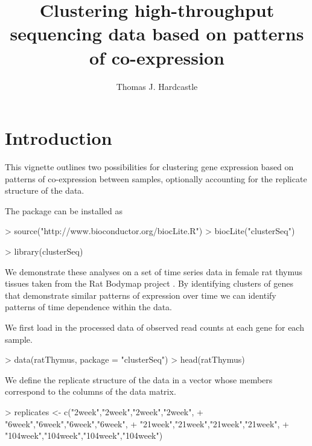 \documentclass[a4paper]{article}
\title{Clustering high-throughput sequencing data based on patterns of co-expression}
\author{Thomas J. Hardcastle}
\begin{document}
\maketitle

\section{Introduction}

This vignette outlines two possibilities for clustering gene expression based on patterns of co-expression between samples, optionally accounting for the replicate structure of the data.

The package can be installed as
\begin{Schunk}
\begin{Sinput}
> source("http://www.bioconductor.org/biocLite.R")
> biocLite("clusterSeq")
\end{Sinput}
\end{Schunk}

\begin{Schunk}
\begin{Sinput}
> library(clusterSeq)
\end{Sinput}
\end{Schunk}


We demonstrate these analyses on a set of time series data in female rat thymus tissues taken from the Rat Bodymap project \cite{Yu2014}. By identifying clusters of genes that demonstrate similar patterns of expression over time we can identify patterns of time dependence within the data.

We first load in the processed data of observed read counts at each gene for each sample. 
\begin{Schunk}
\begin{Sinput}
> data(ratThymus, package = "clusterSeq")
> head(ratThymus)
\end{Sinput}
\end{Schunk}

We define the replicate structure of the data in a vector whose members correspond to the columns of the data matrix.
\begin{Schunk}
\begin{Sinput}
> replicates <- c("2week","2week","2week","2week",
+                 "6week","6week","6week","6week",
+                 "21week","21week","21week","21week",
+                 "104week","104week","104week","104week")
\end{Sinput}
\end{Schunk}
\end{document}
